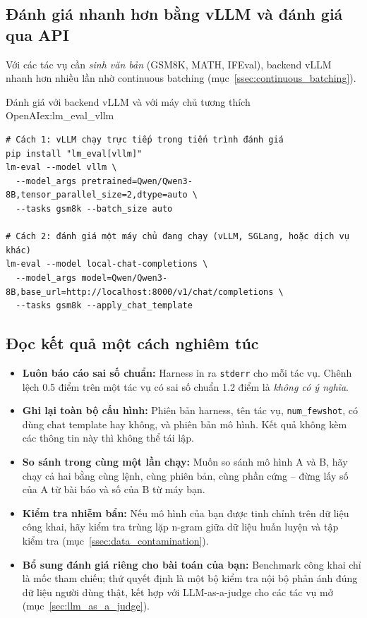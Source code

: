\subsection{Đánh giá nhanh hơn bằng vLLM và đánh giá qua API}
\label{ssec:lm_eval_vllm}
Với các tác vụ cần \emph{sinh văn bản} (GSM8K, MATH, IFEval), backend vLLM nhanh hơn nhiều lần nhờ continuous batching (mục~\ref{ssec:continuous_batching}).
\begin{example}{Đánh giá với backend vLLM và với máy chủ tương thích OpenAI}{ex:lm_eval_vllm}
\begin{verbatim}
# Cách 1: vLLM chạy trực tiếp trong tiến trình đánh giá
pip install "lm_eval[vllm]"
lm-eval --model vllm \
  --model_args pretrained=Qwen/Qwen3-8B,tensor_parallel_size=2,dtype=auto \
  --tasks gsm8k --batch_size auto

# Cách 2: đánh giá một máy chủ đang chạy (vLLM, SGLang, hoặc dịch vụ khác)
lm-eval --model local-chat-completions \
  --model_args model=Qwen/Qwen3-8B,base_url=http://localhost:8000/v1/chat/completions \
  --tasks gsm8k --apply_chat_template
\end{verbatim}
\end{example}

\subsection{Đọc kết quả một cách nghiêm túc}
\label{ssec:lm_eval_reading}
\begin{itemize}
	\item \textbf{Luôn báo cáo sai số chuẩn:} Harness in ra \texttt{stderr} cho mỗi tác vụ. Chênh lệch 0.5 điểm trên một tác vụ có sai số chuẩn 1.2 điểm là \emph{không có ý nghĩa}.
	\item \textbf{Ghi lại toàn bộ cấu hình:} Phiên bản harness, tên tác vụ, \texttt{num\_fewshot}, có dùng chat template hay không, và phiên bản mô hình. Kết quả không kèm các thông tin này thì không thể tái lập.
	\item \textbf{So sánh trong cùng một lần chạy:} Muốn so sánh mô hình A và B, hãy chạy cả hai bằng cùng lệnh, cùng phiên bản, cùng phần cứng -- đừng lấy số của A từ bài báo và số của B từ máy bạn.
	\item \textbf{Kiểm tra nhiễm bẩn:} Nếu mô hình của bạn được tinh chỉnh trên dữ liệu công khai, hãy kiểm tra trùng lặp n-gram giữa dữ liệu huấn luyện và tập kiểm tra (mục~\ref{ssec:data_contamination}).
	\item \textbf{Bổ sung đánh giá riêng cho bài toán của bạn:} Benchmark công khai chỉ là mốc tham chiếu; thứ quyết định là một bộ kiểm tra nội bộ phản ánh đúng dữ liệu người dùng thật, kết hợp với LLM-as-a-judge cho các tác vụ mở (mục~\ref{sec:llm_as_a_judge}).
\end{itemize}


